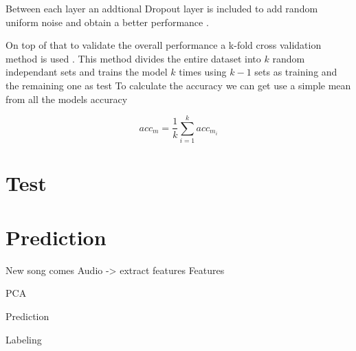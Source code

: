 Between each layer an addtional Dropout layer is included to add random uniform noise and obtain a better performance \cite{Srivastava2014}.

On top of that to validate the overall performance a k-fold cross validation method is used \cite{Rodriguez2010}.
This method divides the entire dataset into $k$ random independant sets and trains the model $k$ times using $k - 1$ sets as training and the remaining one as test
To calculate the accuracy we can get use a simple mean from all the models accuracy

$$acc_{m} = \frac{1}{k}\sum_{i=1}^{k} acc_{m_{i}}$$



\section{Test}

\cite{Flach2015}
\cite{Davis2006}


\section{Prediction}

New song comes
    Audio -> extract features
    Features

    PCA


    Prediction

    Labeling


